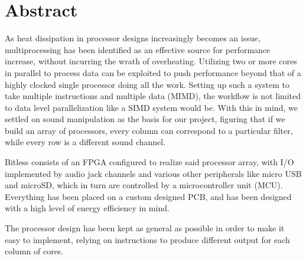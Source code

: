 \section*{Abstract}
As heat dissipation in processor designs increasingly becomes an issue, multiprocessing has been identified as an effective source for performance increase, without incurring the wrath of overheating. Utilizing two or more cores in parallel to process data can be exploited to push performance beyond that of a highly clocked single processor doing all the work. Setting up such a system to take multiple instructions and multiple data (MIMD), the workflow is not limited to data level parallelization like a SIMD system would be. With this in mind, we settled on sound manipulation as the basis for our project, figuring that if we build an array of processors, every column can correspond to a particular filter, while every row is a different sound channel.
\newline

Bitless consists of an FPGA configured to realize said processor array, with I/O implemented by audio jack channels and various other peripherals like micro USB and microSD, which in turn are controlled by a microcontroller unit (MCU). Everything has been placed on a custom designed PCB, and has been designed with a high level of energy efficiency in mind.
\newline

The processor design has been kept as general as possible in order to make it easy to implement, relying on instructions to produce different output for each column of cores.
\newline

